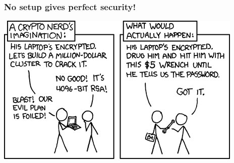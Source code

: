 \documentclass[aspectratio=169,dvipsnames]{beamer}
\begin{document}
\begin{frame}
\frametitle{No setup gives perfect security!}
\begin{center}
\includegraphics[height=0.65\textheight,keepaspectratio]{images/security.png} 
\end{center}
\end{frame}
\end{document}
